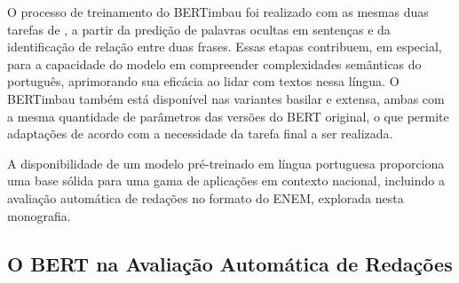 O processo de treinamento do BERTimbau foi realizado com as mesmas duas tarefas de \citet{bert2018}, a partir da predição de palavras ocultas em sentenças e da identificação de relação entre duas frases. Essas etapas contribuem, em especial, para a capacidade do modelo em compreender complexidades semânticas do português, aprimorando sua eficácia ao lidar com textos nessa língua. O BERTimbau também está disponível nas variantes basilar e extensa, ambas com a mesma quantidade de parâmetros das versões do BERT original, o que permite adaptações de acordo com a necessidade da tarefa final a ser realizada.

A disponibilidade de um modelo pré-treinado em língua portuguesa proporciona uma base sólida para uma gama de aplicações em contexto nacional, incluindo a avaliação automática de redações no formato do ENEM, explorada nesta monografia.

\subsection{O BERT na Avaliação Automática de Redações}
